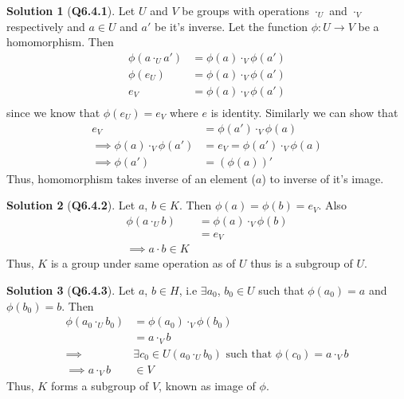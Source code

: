 \documentclass{article}
\theoremstyle{definition}
\newtheorem*{sol}{Solution}
\begin{document}
\begin{sol}[\textbf{Q6.4.1}]
	Let $U$ and $V$ be groups with operations $\cdot_U$ and $\cdot_V$ respectively and $a\in U$ and $a'$ be it's inverse. Let the function $\phi : U \rightarrow V$ be a homomorphism. Then
	\begin{align}
		\phi(a\cdot_U a') & = \phi(a)\cdot_V \phi(a')  \\
		\phi(e_U)         & = \phi(a) \cdot_V \phi(a') \\
		e_V               & = \phi(a) \cdot_V \phi(a') \\
	\end{align}
	since we know that $\phi(e_U)=e_V$ where $e$ is identity. Similarly we can show that
	\begin{align}
		e_V                             & = \phi(a')\cdot_V\phi(a)       \\
		\implies \phi(a)\cdot_V\phi(a') & = e_V = \phi(a')\cdot_V\phi(a) \\
		\implies \phi(a')               & = (\phi(a))'
	\end{align}
	Thus, homomorphism takes inverse of an element ($a$) to inverse of it's image.
\end{sol}

\begin{sol}[\textbf{Q6.4.2}]
	Let $a$, $b \in K$. Then $\phi(a)=\phi(b)=e_V$. Also
	\begin{align}
		\phi(a\cdot_U b) & = \phi(a)\cdot_V\phi(b) \\
		                 & = e_V                   \\
		\implies a\cdot b \in K
	\end{align}
	Thus, $K$ is a group under same operation as of $U$ thus is a subgroup of $U$.
\end{sol}

\begin{sol}[\textbf{Q6.4.3}]
	Let $a$, $b \in H$, i.e $\exists a_0$, $b_0 \in U$ such that $\phi(a_0) = a$ and $\phi(b_0) = b$.
	Then
	\begin{align}
		\phi(a_0\cdot_U b_0) & =
		\phi(a_0)\cdot_V\phi(b_0)                                                                        \\
		                     & = a\cdot_Vb                                                               \\
		\implies             & \exists c_0\in U (a_0\cdot_Ub_0) \text{ such that } \phi(c_0) = a\cdot_Vb \\
		\implies a\cdot_Vb   & \in V
	\end{align}
	Thus, $K$ forms a subgroup of $V$, known as image of $\phi$.
\end{sol}
\end{document}
